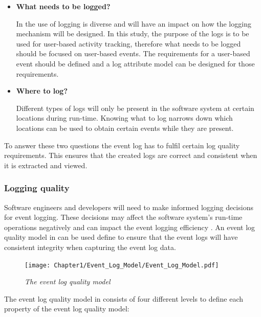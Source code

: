 \begin{itemize}
	\item \textbf{What needs to be logged?}\par In  the use of logging is diverse and will have an impact on how the logging mechanism will be designed. In this study, the purpose of the logs is to be used for user-based activity tracking, therefore what needs to be logged should be focused on user-based events. The requirements for a user-based event should be defined and a log attribute model can be designed for those requirements.
	\item \textbf{Where to log?} \par Different types of logs will only be present in the software system at certain locations during run-time. Knowing what to log narrows down which locations can be used to obtain certain events while they are present.
\end{itemize}

To answer these two questions the event log has to fulfil certain log quality requirements. This ensures that the created logs are correct and consistent when it is extracted and viewed. 

\clearpage

\subsubsection{Logging quality}\label{sec:ch1_loggingQuality}

Software engineers and developers will need to make informed logging decisions for event logging. These decisions may affect the software system's run-time operations negatively and can impact the event logging efficiency \cite{Zhu2015, Zhu2019, Kherbouche2017}. An event log quality model in  can be used define to ensure that the event logs will have consistent integrity when capturing the event log data.

\begin{figure}[!htb] %
	\centering %
	\texttt{[image: Chapter1/Event\_Log\_Model/Event\_Log\_Model.pdf]}
	\caption[The event log quality model]
	{\textit{The event log quality model \cite{Kherbouche2017}}} \label{fig:ch1_EventQModel}
\end{figure}

The event log quality model in  consists of four different levels to define each property of the event log quality model:

